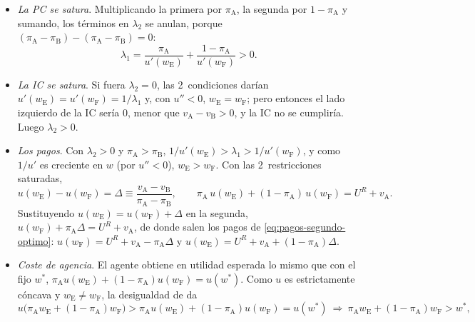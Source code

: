 \documentclass[11pt]{article}
\begin{document}
\begin{itemize}
\begin{align}
  \end{align}
  que es \eqref{eq:holmstrom-mirrlees}.
\item \emph{La PC se satura}. Multiplicando la primera por $\pi_{\mathrm{A}}$, la segunda por $1-\pi_{\mathrm{A}}$ y sumando, los términos en $\lambda_2$ se anulan, porque $(\pi_{\mathrm{A}}-\pi_{\mathrm{B}})-(\pi_{\mathrm{A}}-\pi_{\mathrm{B}})=0$:
  \begin{equation}
  \lambda_1=\frac{\pi_{\mathrm{A}}}{u'(w_{\mathrm{E}})}+\frac{1-\pi_{\mathrm{A}}}{u'(w_{\mathrm{F}})}>0 .
  \end{equation}
\item \emph{La IC se satura}. Si fuera $\lambda_2=0$, las 2~condiciones darían $u'(w_{\mathrm{E}})=u'(w_{\mathrm{F}})=1/\lambda_1$ y, con $u''<0$, $w_{\mathrm{E}}=w_{\mathrm{F}}$; pero entonces el lado izquierdo de la IC sería 0, menor que $v_{\mathrm{A}}-v_{\mathrm{B}}>0$, y la IC no se cumpliría. Luego $\lambda_2>0$.
\item \emph{Los pagos}. Con $\lambda_2>0$ y $\pi_{\mathrm{A}}>\pi_{\mathrm{B}}$, $1/u'(w_{\mathrm{E}})>\lambda_1>1/u'(w_{\mathrm{F}})$, y como $1/u'$ es creciente en $w$ (por $u''<0$), $w_{\mathrm{E}}>w_{\mathrm{F}}$. Con las 2~restricciones saturadas,
  \begin{equation}
  u(w_{\mathrm{E}})-u(w_{\mathrm{F}})=\Delta\equiv\frac{v_{\mathrm{A}}-v_{\mathrm{B}}}{\pi_{\mathrm{A}}-\pi_{\mathrm{B}}},\qquad \pi_{\mathrm{A}}\,u(w_{\mathrm{E}})+(1-\pi_{\mathrm{A}})\,u(w_{\mathrm{F}})=U^R+v_{\mathrm{A}} .
  \end{equation}
  Sustituyendo $u(w_{\mathrm{E}})=u(w_{\mathrm{F}})+\Delta$ en la segunda, $u(w_{\mathrm{F}})+\pi_{\mathrm{A}}\Delta=U^R+v_{\mathrm{A}}$, de donde salen los pagos de \eqref{eq:pagos-segundo-optimo}: $u(w_{\mathrm{F}})=U^R+v_{\mathrm{A}}-\pi_{\mathrm{A}}\Delta$ y $u(w_{\mathrm{E}})=U^R+v_{\mathrm{A}}+(1-\pi_{\mathrm{A}})\Delta$.
\item \emph{Coste de agencia}. El agente obtiene en utilidad esperada lo mismo que con el fijo $w^*$, $\pi_{\mathrm{A}}u(w_{\mathrm{E}})+(1-\pi_{\mathrm{A}})u(w_{\mathrm{F}})=u(w^*)$. Como $u$ es estrictamente cóncava y $w_{\mathrm{E}}\neq w_{\mathrm{F}}$, la desigualdad de  da
  \begin{equation}
  u\bigl(\pi_{\mathrm{A}}w_{\mathrm{E}}+(1-\pi_{\mathrm{A}})w_{\mathrm{F}}\bigr)>\pi_{\mathrm{A}}u(w_{\mathrm{E}})+(1-\pi_{\mathrm{A}})u(w_{\mathrm{F}})=u(w^*)\ \Longrightarrow\ \pi_{\mathrm{A}}w_{\mathrm{E}}+(1-\pi_{\mathrm{A}})w_{\mathrm{F}}>w^* ,
  \end{equation}

\end{itemize}
\end{document}
